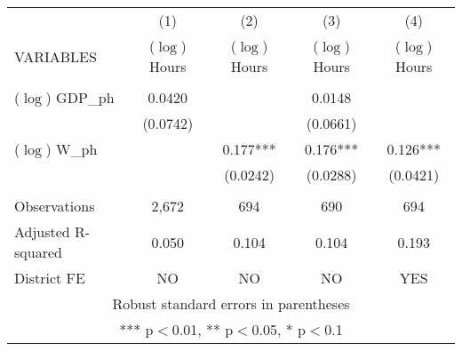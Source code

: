 \documentclass[]{article}
\begin{document}
\begin{tabular}{lcccc} \hline
 & (1) & (2) & (3) & (4) \\
VARIABLES & ($\log$) Hours & ($\log$) Hours & ($\log$) Hours & ($\log$) Hours \\ \hline
 &  &  &  &  \\
($\log$) GDP_{ph} & 0.0420 &  & 0.0148 &  \\
 & (0.0742) &  & (0.0661) &  \\
($\log$) W_{ph} &  & 0.177*** & 0.176*** & 0.126*** \\
 &  & (0.0242) & (0.0288) & (0.0421) \\
 &  &  &  &  \\
Observations & 2,672 & 694 & 690 & 694 \\
Adjusted R-squared & 0.050 & 0.104 & 0.104 & 0.193 \\
 District FE & NO & NO & NO & YES \\ \hline
\multicolumn{5}{c}{ Robust standard errors in parentheses} \\
\multicolumn{5}{c}{ *** p$<$0.01, ** p$<$0.05, * p$<$0.1} \\
\end{tabular}
\end{document}
